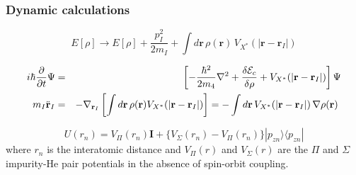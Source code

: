 \documentclass[11pt,a4paper,twoside]{article}
\begin{document}
			\subsubsection{Dynamic calculations}

\begin{equation}
E[\rho] \rightarrow E[\rho] + \frac{p^2_I}{2 m_I} + \int d \mathbf{r} \, \rho(\mathbf{r}) \,  V_{X^*}(|\mathbf{r}- \mathbf{r}_I|) 
 \label{eq33}
\end{equation}

\begin{eqnarray}
i\hbar\frac{\partial}{\partial t} \Psi
&=&
\left[
  -\frac{\hbar^2}{2m_4} \nabla^2 +
  \frac{\delta {\cal E}_c}{\delta \rho}
  +
  V_{X^*}(|\mathbf{r}- \mathbf{r}_I|)
\right]
\Psi
\nonumber
\\
m_I \ddot{\mathbf{r}}_I
&=&
- \nabla_{\mathbf{r}_I}
\left[  \int d \mathbf{r} \,\rho(\mathbf{r}) V_{X^*}(|\mathbf{r}- \mathbf{r}_I|)  \right]  =
-  \int d \mathbf{r} \, V_{X^*}(|\mathbf{r}- \mathbf{r}_I|)  \, \nabla \rho(\mathbf{r})  
 \;
\label{eq34}
\end{eqnarray}

\begin{equation}
U(r_n)= 
V_{\Pi}(r_n)\mathbf{I}+\{V_{\Sigma}(r_n)-V_{\Pi}(r_n)\}|p_{zn}\rangle\langle p_{zn} |  
\label{eq37}
\end{equation}
%
where $r_n$ is the interatomic distance and $V_\Pi(r)$ and $V_\Sigma(r)$ are the $\Pi$ and $\Sigma$ impurity-He pair potentials in the absence of spin-orbit coupling.
\end{document}
